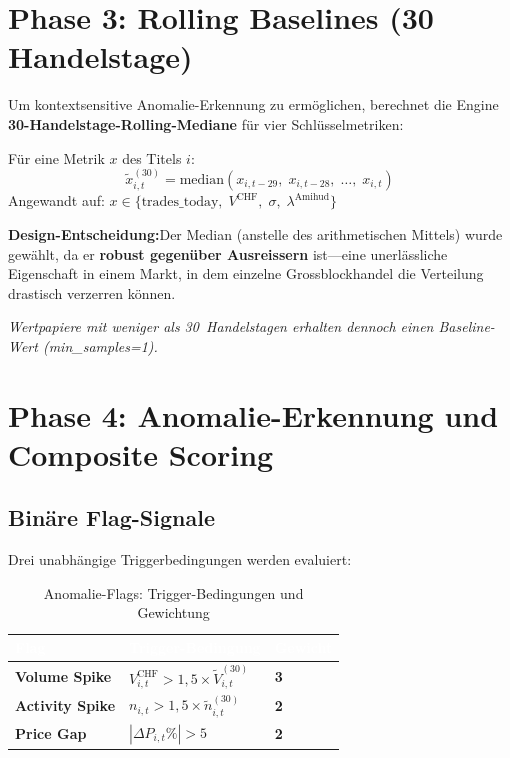 \documentclass[11pt, a4paper, oneside, openany]{report}
\newcommand{\code}[1]{{\codefont\small\textcolor{DeepNavy}{#1}}}
\begin{document}
\section{Phase 3: Rolling Baselines (30 Handelstage)}

Um kontextsensitive Anomalie-Erkennung zu ermöglichen, berechnet die Engine \textbf{30-Handelstage-Rolling-Mediane} für vier Schlüsselmetriken:

\begin{mathbox}
Für eine Metrik $x$ des Titels $i$:
\[
  \tilde{x}_{i,t}^{(30)} = \text{median}\!\left(x_{i,t-29},\; x_{i,t-28},\; \ldots,\; x_{i,t}\right)
\]
Angewandt auf: $x \in \{\text{trades\_today},\; V^{\text{CHF}},\; \sigma,\; \lambda^{\text{Amihud}}\}$

\textbf{Design-Entscheidung:}\;Der Median (anstelle des arithmetischen Mittels) wurde gewählt, da er \textbf{robust gegenüber Ausreissern} ist\;---\;eine unerlässliche Eigenschaft in einem Markt, in dem einzelne Grossblockhandel die Verteilung drastisch verzerren können.

\textit{Wertpapiere mit weniger als 30~Handelstagen erhalten dennoch einen Baseline-Wert (\code{min\_samples=1}).}
\end{mathbox}

\section{Phase 4: Anomalie-Erkennung und Composite Scoring}

\subsection{Binäre Flag-Signale}

Drei unabhängige Triggerbedingungen werden evaluiert:

\begin{table}[H]
\centering
\caption{Anomalie-Flags: Trigger-Bedingungen und Gewichtung}
\label{tab:flags}
\sffamily\small
\begin{tabularx}{\textwidth}{>{\bfseries\sffamily}p{3cm} X >{\centering\arraybackslash}p{1.5cm}}
  \toprule
  \rowcolor{DeepNavy} \textcolor{white}{\textbf{Flag}} & \textcolor{white}{\textbf{Trigger-Bedingung}} & \textcolor{white}{\textbf{Gewicht}} \\
  \midrule
  Volume Spike    & $V_{i,t}^{\text{CHF}} > 1{,}5 \times \tilde{V}_{i,t}^{(30)}$ & \textbf{3} \\
  Activity Spike  & $n_{i,t} > 1{,}5 \times \tilde{n}_{i,t}^{(30)}$               & \textbf{2} \\
  Price Gap       & $|\Delta P_{i,t}\%| > 5$                                       & \textbf{2} \\
  \bottomrule
\end{tabularx}
\end{table}
\end{document}
